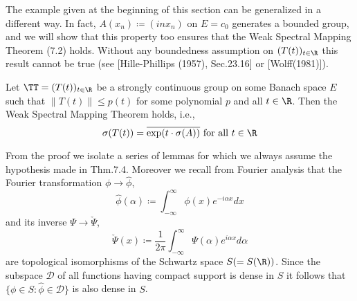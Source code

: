The example given at the beginning of this section can be generalized in a different way.
In fact, $A(x_{n}) \coloneqq (inx_{n})$ on $E = c_{0}$ generates a bounded group, and we will show that this property too ensures that the Weak Spectral Mapping Theorem (7.2) holds.
Without any boundedness assumption on $(T(t))_{t\in\R}$ this result cannot be true (see [Hille-Phillips (1957), Sec.23.16] or [Wolff(1981)]).


\newpage
\begin{theorem}\label{thm:a3-7.4}
Let $\TT = (T(t))_{t\in\R}$ be a strongly continuous group on some Banach space $E$ such that $\|T(t)\| \leq p(t)$ for some polynomial $p$ and all $t \in \R$.
Then the Weak Spectral Mapping Theorem holds, i.e.,
\[
\sigma(T(t)) = \overline{\exp(t\cdot\sigma(A))} \text{ for all } t \in \R
\]
\end{theorem}

From the proof we isolate a series of lemmas for which we always assume the hypothesis made in Thm.7.4.
Moreover we recall from Fourier analysis that the Fourier transformation $\phi \to \hat{\phi}$,
\[
\hat{\phi}(\alpha) \coloneqq \int_{-\infty}^{\infty} \phi(x)e^{-i\alpha x} dx
\]
and its inverse $\Psi \to \check{\Psi}$,
\[
\check{\Psi}(x) \coloneqq \frac{1}{2\pi}\int_{-\infty}^{\infty} \Psi(\alpha)e^{i\alpha x} d\alpha
\]
are topological isomorphisms of the Schwartz space $S ( = S(\R))$.
Since the subspace $\mathcal{D}$ of all functions having compact support is dense in $S$ it follows that $\{\phi \in S \colon \hat{\phi} \in \mathcal{D}\}$ is also dense in $S$.

